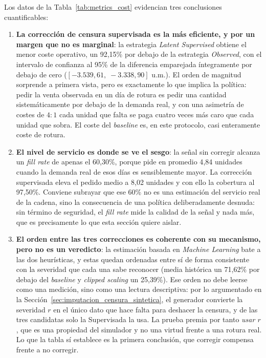 Los datos de la Tabla~\ref{tab:metrics_cost} evidencian tres conclusiones cuantificables:

\begin{enumerate}
    \item \textbf{La corrección de censura supervisada es la más eficiente, y por un margen que no es marginal}: la estrategia \textit{Latent Supervised} obtiene el menor coste operativo, un 92{,}15\% por debajo de la estrategia \textit{Observed}, con el intervalo de confianza al 95\% de la diferencia emparejada íntegramente por debajo de cero ($[-3.539{,}61,\; -3.338{,}90]$ u.m.). El orden de magnitud sorprende a primera vista, pero es exactamente lo que implica la política: pedir la venta observada en un día de rotura es pedir una cantidad sistemáticamente por debajo de la demanda real, y con una asimetría de costes de $4{:}1$ cada unidad que falta se paga cuatro veces más caro que cada unidad que sobra. El coste del \textit{baseline} es, en este protocolo, casi enteramente coste de rotura.

    \item \textbf{El nivel de servicio es donde se ve el sesgo}: la señal sin corregir alcanza un \textit{fill rate} de apenas el 60{,}30\%, porque pide en promedio 4{,}84 unidades cuando la demanda real de esos días es sensiblemente mayor. La corrección supervisada eleva el pedido medio a 8{,}02 unidades y con ello la cobertura al 97{,}50\%. Conviene subrayar que ese 60\% no es una estimación del servicio real de la cadena, sino la consecuencia de una política deliberadamente desnuda: sin término de seguridad, el \textit{fill rate} mide la calidad de la señal y nada más, que es precisamente lo que esta sección quiere aislar.

    \item \textbf{El orden entre las tres correcciones es coherente con su mecanismo, pero no es un veredicto}: la estimación basada en \textit{Machine Learning} bate a las dos heurísticas, y estas quedan ordenadas entre sí de forma consistente con la severidad que cada una sabe reconocer (media histórica un 71{,}62\% por debajo del \textit{baseline} y \textit{clipped scaling} un 25{,}39\%). Ese orden no debe leerse como una medición, sino como una lectura descriptiva: por lo argumentado en la Sección~\ref{sec:imputacion_censura_sintetica}, el generador convierte la severidad $r$ en el único dato que hace falta para deshacer la censura, y de las tres candidatas solo la Supervisada la usa. La prueba premia por tanto \emph{usar $r$}, que es una propiedad del simulador y no una virtud frente a una rotura real. Lo que la tabla sí establece es la primera conclusión, que corregir compensa frente a no corregir.
\end{enumerate}

